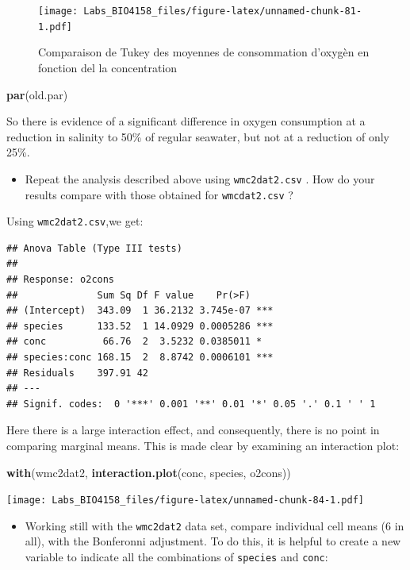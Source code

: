 \documentclass[
  12pt,
]{book}
\newenvironment{Shaded}{\begin{snugshade}}{\end{snugshade}}
\newcommand{\KeywordTok}[1]{\textcolor[rgb]{0.13,0.29,0.53}{\textbf{#1}}}
\newcommand{\NormalTok}[1]{#1}
\providecommand{\tightlist}{%
  \setlength{\itemsep}{0pt}\setlength{\parskip}{0pt}}
\begin{document}
\begin{figure}
\centering
\texttt{[image: Labs\_BIO4158\_files/figure-latex/unnamed-chunk-81-1.pdf]}
\caption{\label{fig:unnamed-chunk-81}Comparaison de Tukey des moyennes de consommation d'oxygèn en fonction del la concentration}
\end{figure}

\begin{Shaded}
\begin{Highlighting}[]
\KeywordTok{par}\NormalTok{(old.par)}
\end{Highlighting}
\end{Shaded}

So there is evidence of a significant difference in oxygen consumption at a reduction in salinity to 50\% of regular seawater, but not at a reduction of only 25\%.

\begin{itemize}
\tightlist
\item
  Repeat the analysis described above using \texttt{wmc2dat2.csv} . How do
  your results compare with those obtained for \texttt{wmcdat2.csv} ?
\end{itemize}

Using \texttt{wmc2dat2.csv},we get:

\begin{verbatim}
## Anova Table (Type III tests)
## 
## Response: o2cons
##              Sum Sq Df F value    Pr(>F)    
## (Intercept)  343.09  1 36.2132 3.745e-07 ***
## species      133.52  1 14.0929 0.0005286 ***
## conc          66.76  2  3.5232 0.0385011 *  
## species:conc 168.15  2  8.8742 0.0006101 ***
## Residuals    397.91 42                      
## ---
## Signif. codes:  0 '***' 0.001 '**' 0.01 '*' 0.05 '.' 0.1 ' ' 1
\end{verbatim}

Here there is a large interaction effect, and consequently, there is no
point in comparing marginal means. This is made clear by examining
an interaction plot:

\begin{Shaded}
\begin{Highlighting}[]
\KeywordTok{with}\NormalTok{(wmc2dat2, }\KeywordTok{interaction.plot}\NormalTok{(conc, species, o2cons))}
\end{Highlighting}
\end{Shaded}

\texttt{[image: Labs\_BIO4158\_files/figure-latex/unnamed-chunk-84-1.pdf]}

\begin{itemize}
\tightlist
\item
  Working still with the \texttt{wmc2dat2} data set, compare individual cell means (6 in all), with the Bonferonni adjustment. To do this, it is helpful to create a new variable to indicate all the combinations of \texttt{species} and \texttt{conc}:
\end{itemize}
\end{document}

